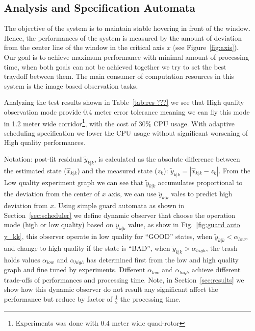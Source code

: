 \documentclass{sig-alternate-ipsn13}
\begin{document}
\subsection{Analysis and Specification Automata}
\label{sec:Analysis}

The objective of the system is to maintain stable hovering in front of the window. Hence, the performances of the system is measured by the amount of deviation from the center line of the window in the critical axis $x$ (see Figure~\ref{fig:axis}). Our goal is to achieve maximum performance with minimal amount of processing time, when both goals can not be achieved together we try to set the best traydoff between them. The main consumer of computation resources in this system is the image based observation tasks.

Analyzing the test results shown in Table~\ref{tab:res ???} we see that High quality observation mode provide 0.4 meter error tolerance meaning we can fly this mode in 1.2 meter wide corridor\footnote{Experiments was done with 0.4 meter wide quad-rotor}, with the cost of 30\% CPU usage. 
With adaptive scheduling specification we lower the CPU usage without significant worsening of High quality performances.

Notation: post-fit residual $\tilde{y}_{k|k}$, is calculated as the absolute difference between the estimated state ($\hat{x}_{k|k}$) and the measured state ($z_k$): $\tilde{y}_{k|k} = |  \hat{x}_{k|k} - z_k |$.
From the Low quality experiment graph we can see that $\tilde{y}_{k|k}$ accumulates proportional to the deviation from the center of $x$ axis, we can use $\tilde{y}_{k|k}$ vales to predict high deviation from $x$.
Using simple guard automata as shown in Section~\ref{sec:scheduler} we define dynamic observer that choose the operation mode (high or low quality) based on $\tilde{y}_{k|k}$ value, as show in Fig.~\ref{fig:guard auto y_kk}, this observer operate in low quality for ``GOOD'' states, when $\tilde{y}_{k|k} < \alpha_{low}$, and change to high quality if the state is ``BAD'', when $\tilde{y}_{k|k} > \alpha_{high}$, the trash holds values $ \alpha_{low}$ and $ \alpha_{high}$ has determined first from the low and high quality graph and fine tuned by experiments. 
Different $ \alpha_{low}$ and $ \alpha_{high}$ achieve different trade-offs of performances and processing time.
Note, in Section~\ref{sec:results} we show how this dynamic observer do not result any significant affect the performance but reduce by factor of $\frac{1}{2}$ the processing time.
\end{document}
